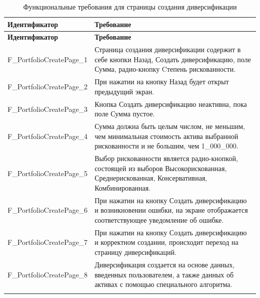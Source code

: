 \documentclass[a4paper, 14pt]{article}
\begin{document}
\begin{longtable}{| p{} | p{} |}
    \hline
    \textbf{Идентификатор}          & \textbf{Требование}                                                                                                                                                                \\
    \hline
    \endfirsthead
    \hline
    \textbf{Идентификатор}          & \textbf{Требование}                                                                                                                                                                \\
    \hline
    \endhead

    F\_PortfolioCreatePage\_1 & Страница создания диверсификации содержит в себе кнопки Назад, Создать диверсификацию, поле Сумма, радио-кнопку Cтепень рискованности.                                                          \\ \hline
    F\_PortfolioCreatePage\_2 & При нажатии на кнопку Назад будет открыт предыдущий экран.                                                                                                                         \\ \hline
    F\_PortfolioCreatePage\_3 & Кнопка Создать диверсификацию неактивна, пока поле Сумма пустое.                                                                                                                   \\ \hline
    F\_PortfolioCreatePage\_4 & Сумма должна быть целым числом, не меньшим, чем минимальная стоимость актива выбранной рискованности и не большим, чем 1\_000\_000.                                                                                                                   \\ \hline
    F\_PortfolioCreatePage\_5 & Выбор рискованности является радио-кнопкой, состоящей из выборов Высокорискованная, Среднерискованная, Консервативная, Комбинированная.                                            \\ \hline
    F\_PortfolioCreatePage\_6 & При нажатии на кнопку Создать диверсификацию и возникновении ошибки, на экране отображается соответствующее уведомление об ошибке.                           \\ \hline
    F\_PortfolioCreatePage\_7 & При нажатии на кнопку Создать диверсификацию и корректном создании, происходит переход на страницу диверсификаций.                                                                 \\ \hline
    F\_PortfolioCreatePage\_8 & Диверсификация создается на основе данных, введенных пользователем, а также данных об активах с помощью специального алгоритма.                                                                 \\ \hline

    \caption{Функциональные требования для страницы создания диверсификации}
\end{longtable}
\end{document}
